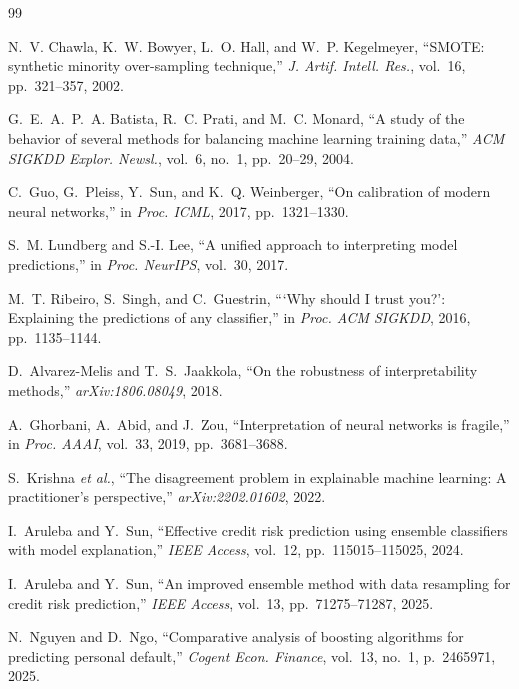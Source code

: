\documentclass[journal]{IEEEtran}
\begin{document}
\begin{thebibliography}{99}

N.~V. Chawla, K.~W. Bowyer, L.~O. Hall, and W.~P. Kegelmeyer, ``SMOTE:
synthetic minority over-sampling technique,'' \emph{J. Artif. Intell. Res.},
vol.~16, pp.~321--357, 2002.

G.~E.~A.~P.~A. Batista, R.~C. Prati, and M.~C. Monard, ``A study of the behavior
of several methods for balancing machine learning training data,''
\emph{ACM SIGKDD Explor. Newsl.}, vol.~6, no.~1, pp.~20--29, 2004.

C.~Guo, G.~Pleiss, Y.~Sun, and K.~Q. Weinberger, ``On calibration of modern
neural networks,'' in \emph{Proc. ICML}, 2017, pp.~1321--1330.

S.~M. Lundberg and S.-I. Lee, ``A unified approach to interpreting model
predictions,'' in \emph{Proc. NeurIPS}, vol.~30, 2017.

M.~T. Ribeiro, S.~Singh, and C.~Guestrin, ```Why should I trust you?':
Explaining the predictions of any classifier,'' in \emph{Proc. ACM SIGKDD},
2016, pp.~1135--1144.

D.~Alvarez-Melis and T.~S.~Jaakkola, ``On the robustness of interpretability
methods,'' \emph{arXiv:1806.08049}, 2018.

A.~Ghorbani, A.~Abid, and J.~Zou, ``Interpretation of neural networks is
fragile,'' in \emph{Proc. AAAI}, vol.~33, 2019, pp.~3681--3688.

S.~Krishna \emph{et al.}, ``The disagreement problem in explainable machine
learning: A practitioner's perspective,'' \emph{arXiv:2202.01602}, 2022.

I.~Aruleba and Y.~Sun, ``Effective credit risk prediction using ensemble
classifiers with model explanation,'' \emph{IEEE Access}, vol.~12,
pp.~115015--115025, 2024.

I.~Aruleba and Y.~Sun, ``An improved ensemble method with data resampling for
credit risk prediction,'' \emph{IEEE Access}, vol.~13, pp.~71275--71287, 2025.

N.~Nguyen and D.~Ngo, ``Comparative analysis of boosting algorithms for
predicting personal default,'' \emph{Cogent Econ. Finance}, vol.~13, no.~1,
p.~2465971, 2025.


\end{thebibliography}
\end{document}
